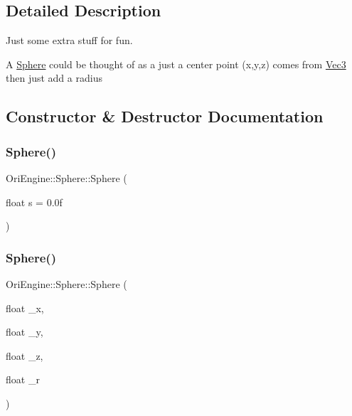 \subsection{Detailed Description}
Just some extra stuff for fun. 

A \hyperlink{struct_ori_engine_1_1_sphere}{Sphere} could be thought of as a just a center point (x,y,z) comes from \hyperlink{struct_ori_engine_1_1_vec3}{Vec3} then just add a radius 

\subsection{Constructor \& Destructor Documentation}
\hypertarget{struct_ori_engine_1_1_sphere_ac20aefe7563c0713c9ff1129887437fd}{}\label{struct_ori_engine_1_1_sphere_ac20aefe7563c0713c9ff1129887437fd} 
\subsubsection{\texorpdfstring{Sphere()}{Sphere()}\hspace{0.1cm}{\footnotesize\ttfamily [1/3]}}
{\footnotesize\ttfamily Ori\+Engine\+::\+Sphere\+::\+Sphere (\begin{DoxyParamCaption}\item[{float}]{s = {\ttfamily 0.0f} }\end{DoxyParamCaption})\hspace{0.3cm}{\ttfamily [inline]}}

\hypertarget{struct_ori_engine_1_1_sphere_ad2abc0c7e4786dcf29394b30cbeca2dd}{}\label{struct_ori_engine_1_1_sphere_ad2abc0c7e4786dcf29394b30cbeca2dd} 
\subsubsection{\texorpdfstring{Sphere()}{Sphere()}\hspace{0.1cm}{\footnotesize\ttfamily [2/3]}}
{\footnotesize\ttfamily Ori\+Engine\+::\+Sphere\+::\+Sphere (\begin{DoxyParamCaption}\item[{float}]{\+\_\+x,  }\item[{float}]{\+\_\+y,  }\item[{float}]{\+\_\+z,  }\item[{float}]{\+\_\+r }\end{DoxyParamCaption})\hspace{0.3cm}{\ttfamily [inline]}}

